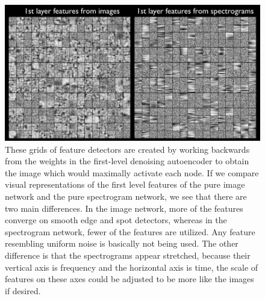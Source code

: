 \documentclass[12pt]{article}
\begin{document}
\begin{doublespacing}
\begin{figure}[p]
\centering
\includegraphics[width=6in]{feature_comparison}
\caption{These grids of feature detectors are created by working backwards from the weights in the first-level denoising autoencoder to obtain the image which would maximally activate each node. If we compare visual representations of the first level features of the pure image network and the pure spectrogram network, we see that there are two main differences. In the image network, more of the features converge on smooth edge and spot detectors, whereas in the spectrogram network, fewer of the features are utilized. Any feature resembling uniform noise is basically not being used. The other difference is that the spectrograms appear stretched, because their vertical axis is frequency and the horizontal axis is time, the scale of features on these axes could be adjusted to be more like the images if desired.}
\label{fig:feature_comparison}
\end{figure}
	

	

\end{doublespacing}
\end{document}
